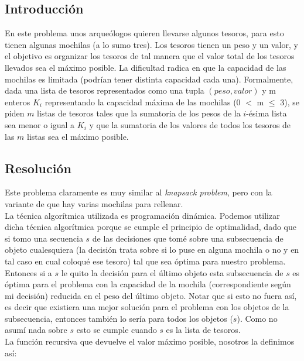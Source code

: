 \subsection{Introducci\'on}
En este problema unos arque\'ologos quieren llevarse algunos tesoros, para esto tienen algunas mochilas (a lo sumo tres).
Los tesoros tienen un peso y un valor, y el objetivo es organizar los tesoros de tal manera que el valor total de los tesoros llevados sea el m\'aximo posible.
La dificultad radica en que la capacidad de las mochilas es limitada (podr\'ian tener distinta capacidad cada una).
Formalmente, dada una lista de tesoros representados como una tupla $(peso, valor)$ y m enteros $K_i$ representando la capacidad m\'axima de las mochilas (0 $<$ m $\leq$ 3),
se piden $m$ listas de tesoros tales que la sumatoria de los pesos de la $i$-\'esima lista sea menor o igual a $K_i$
y que la sumatoria de los valores de todos los tesoros de las $m$ listas sea el m\'aximo posible.

\subsection{Resoluci\'on}
Este problema claramente es muy similar al \emph{knapsack problem}, pero con la variante de que hay varias mochilas para rellenar. \\
La t\'ecnica algor\'itmica utilizada es programaci\'on din\'amica. Podemos utilizar dicha t\'ecnica algor\'itmica porque se cumple el principio de optimalidad, dado que si tomo una secuencia $s$ de las decisiones que tom\'e sobre una subsecuencia de objeto cualesquiera (la decisi\'on trata sobre si lo puse en alguna mochila o no y en tal caso en cual coloqu\'e ese tesoro) tal que sea \'optima para nuestro problema. Entonces si a $s$ le quito la decisi\'on para el \'ultimo objeto esta subsecuencia de $s$ es \'optima para el problema con la capacidad de la mochila (correspondiente seg\'un mi decisi\'on) reducida en el peso del \'ultimo objeto. Notar que si esto no fuera as\'i, es decir que existiera una mejor soluci\'on para el problema con los objetos de la subsecuencia, entonces tambi\'en lo ser\'ia para todos los objetos ($s$). Como no asum\'i nada sobre $s$ esto se cumple cuando $s$ es la lista de tesoros.\\
La funci\'on recursiva que devuelve el valor m\'aximo posible, nosotros la
definimos as\'i: \\

